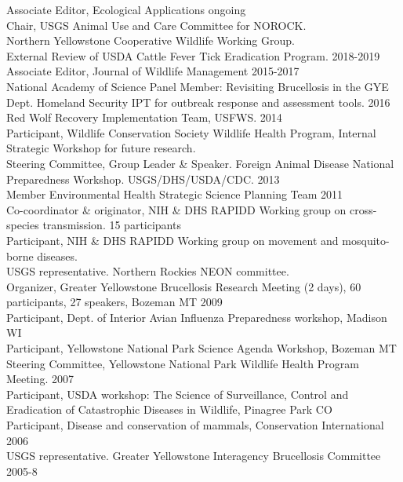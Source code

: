 \documentclass[12pt,]{article}
\begin{document}
Associate Editor, Ecological Applications \hfill ongoing\\
Chair, USGS Animal Use and Care Committee for NOROCK.\\
Northern Yellowstone Cooperative Wildlife Working Group.\\
External Review of USDA Cattle Fever Tick Eradication Program.
\hfill 2018-2019\\
Associate Editor, Journal of Wildlife Management \hfill 2015-2017\\
National Academy of Science Panel Member: Revisiting Brucellosis in the
GYE\\
Dept. Homeland Security IPT for outbreak response and assessment tools.
\hfill 2016\\
Red Wolf Recovery Implementation Team, USFWS. \hfill 2014\\
Participant, Wildlife Conservation Society Wildlife Health Program,
Internal Strategic Workshop for future research.\\
Steering Committee, Group Leader \& Speaker. Foreign Animal Disease
National Preparedness Workshop. USGS/DHS/USDA/CDC. \hfill 2013\\
Member Environmental Health Strategic Science Planning Team
\hfill 2011\\
Co-coordinator \& originator, NIH \& DHS RAPIDD Working group on
cross-species transmission. 15 participants\\
Participant, NIH \& DHS RAPIDD Working group on movement and
mosquito-borne diseases.\\
USGS representative. Northern Rockies NEON committee.\\
Organizer, Greater Yellowstone Brucellosis Research Meeting (2 days), 60
participants, 27 speakers, Bozeman MT \hfill 2009\\
Participant, Dept. of Interior Avian Influenza Preparedness workshop,
Madison WI\\
Participant, Yellowstone National Park Science Agenda Workshop, Bozeman
MT\\
Steering Committee, Yellowstone National Park Wildlife Health Program
Meeting. \hfill 2007\\
Participant, USDA workshop: The Science of Surveillance, Control and
Eradication of Catastrophic Diseases in Wildlife, Pinagree Park CO\\
Participant, Disease and conservation of mammals, Conservation
International \hfill 2006\\
USGS representative. Greater Yellowstone Interagency Brucellosis
Committee \hfill 2005-8
\end{document}
